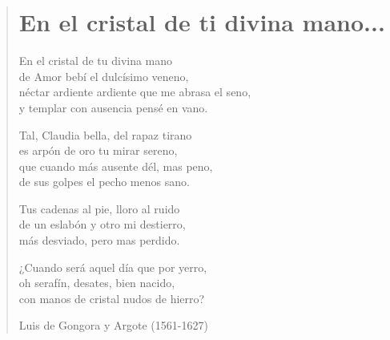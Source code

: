 \documentclass[12pt, twoside]{book}
\begin{document}
\newpage
\begin{verse}
\begin{center}
\section{En el cristal de ti divina mano...}
\end{center}
En el cristal de tu divina mano\\
de Amor bebí el dulcísimo veneno,\\
néctar ardiente ardiente que me abrasa el seno,\\
y templar con ausencia pensé en vano.
\newline

Tal, Claudia bella, del rapaz tirano\\
es arpón de oro tu mirar sereno,\\
que cuando más ausente dél, mas peno,\\
de sus golpes el pecho menos sano.
\newline

Tus cadenas al pie, lloro al ruido\\
de un eslabón y otro mi destierro,\\
más desviado, pero mas perdido.
\newline

¿Cuando será aquel día que por yerro,\\
oh serafín, desates, bien nacido,\\
con manos de cristal nudos de hierro?
\newline

Luis de Gongora y Argote (1561-1627)
\end{verse}
\end{document}
